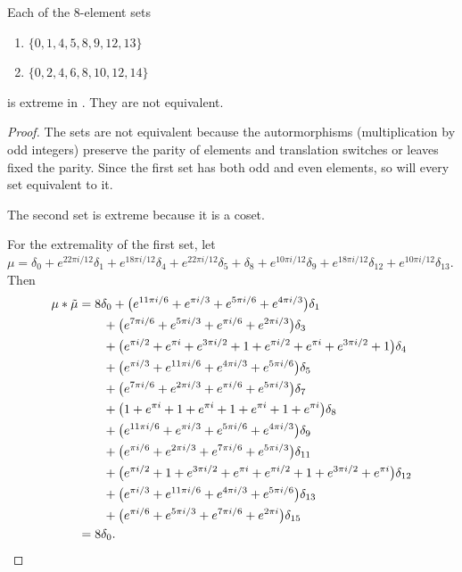 
\begin{prop}\label{prop8in16} Each of the 8-element sets
\begin{enumerate}
\item
$\{0, 1, 4, 5, 8, 9, 12, 13\}$ 
\item $\{0,2,4,6,8,10,12,14\}$ 
\end{enumerate}
is  extreme in . They are not equivalent.
\end{prop}

\begin{proof}
The sets are  not equivalent because the autormorphisms 
(multiplication by odd integers) preserve the parity  of
 elements and translation switches or leaves fixed the 
 parity. Since the first set has both odd and even elements, 
 so will every set equivalent to it. 
 
 The second set is extreme because it is a coset.
 
For the extremality of the first set, let $\mu = \delta_{0} + e^{ 22 \pi i / 12}\delta_{1} + e^{ 18 \pi i / 12}\delta_{4} + e^{ 22 \pi i / 12}\delta_{5} +\delta_{8} + e^{ 10 \pi i / 12}\delta_{9} + e^{ 18 \pi i / 12}\delta_{12} + e^{ 10 \pi i / 12}\delta_{13} 
$.  Then 
\begin{align*} 
\mu * \tilde \mu & = 8\delta_{0}   +  \big( e^{ 11 \pi i / 6}+ e^{\pi i / 3}+ e^{ 5 \pi i / 6}+ e^{ 4 \pi i / 3}\big)\delta_{1}
\\&\qquad  
+  \big( e^{ 7 \pi i / 6}+ e^{ 5 \pi i / 3}+ e^{\pi i / 6}+ e^{ 2 \pi i / 3}\big)\delta_{3} \\&\qquad  +  \big( e^{\pi i / 2}+ e^{\pi i}+ e^{ 3 \pi i / 2}+ 1+ e^{\pi i / 2}+ e^{\pi i}+ e^{ 3 \pi i / 2}+ 1\big)\delta_{4} \\&\qquad  +  \big( e^{\pi i / 3}+ e^{ 11 \pi i / 6}+ e^{ 4 \pi i / 3}+ e^{ 5 \pi i / 6}\big)\delta_{5}
 \\&\qquad  
 +  \big( e^{ 7 \pi i / 6}+ e^{ 2 \pi i / 3}+ e^{\pi i / 6}+ e^{ 5 \pi i / 3}\big)\delta_{7} \\&\qquad  +  \big( 1+ e^{\pi i}+ 1+ e^{\pi i}+ 1+ e^{\pi i}+ 1+ e^{\pi i}\big)\delta_{8} \\&\qquad  +  \big( e^{ 11 \pi i / 6}+ e^{\pi i / 3}+ e^{ 5 \pi i / 6}+ e^{ 4 \pi i / 3}\big)\delta_{9} \\&\qquad  +  \big( e^{\pi i / 6}+ e^{ 2 \pi i / 3}+ e^{ 7 \pi i / 6}+ e^{ 5 \pi i / 3}\big)\delta_{11} \\&\qquad  +  \big( e^{\pi i / 2}+ 1+ e^{ 3 \pi i / 2}+ e^{\pi i}+ e^{\pi i / 2}+ 1+ e^{ 3 \pi i / 2}+ e^{\pi i}\big)\delta_{12} \\&\qquad  +  \big( e^{\pi i / 3}+ e^{ 11 \pi i / 6}+ e^{ 4 \pi i / 3}+ e^{ 5 \pi i / 6}\big)\delta_{13} \\&\qquad  +  \big( e^{\pi i / 6}+ e^{ 5 \pi i / 3}+ e^{ 7 \pi i / 6}+ e^{ 2 \pi i}\big)\delta_{15} 
\\&=8\delta_0.\qedhere
\end{align*}
\end{proof}



